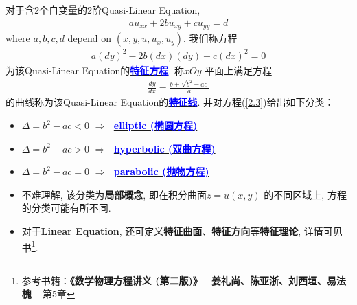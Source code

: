 	\begin{defn}\label{def 2.1.1}
		对于含2个自变量的2阶Quasi-Linear Equation, 
		\begin{align}
			au_{xx} + 2b u_{xy} + cu_{yy} = d \label{2.3}
		\end{align}
		where $a , b , c , d$ depend on $(x , y , u , u_x , u_y)$. 我们称方程
		\begin{align}
			a(dy)^2 - 2b(dx)(dy) + c(dx)^2 = 0 \label{2.4}
		\end{align}
		为该Quasi-Linear Equation的\underline{\textcolor{blue}{\textbf{特征方程}}}. 称$xOy$ 平面上满足方程
		\begin{align}
			\frac{dy}{dx} = \frac{b \pm \sqrt{b^2 - ac}}{a}
		\end{align}
		的曲线称为该Quasi-Linear Equation的\underline{\textcolor{blue}{\textbf{特征线}}}. 并对方程(\ref{2.3})给出如下分类： 
		
		\vspace*{1em}
		
		\begin{itemize}
			\item $\Delta = b^2 - ac < 0 \,\, \Rightarrow \,\,$ \underline{\textcolor{blue}{\textbf{elliptic (椭圆方程)}}}
			
			\item $\Delta = b^2 - ac > 0 \,\, \Rightarrow \,\,$ \underline{\textcolor{blue}{\textbf{hyperbolic (双曲方程)}}}
			
			\item $\Delta = b^2 - ac = 0 \,\, \Rightarrow \,\,$ \underline{\textcolor{blue}{\textbf{parabolic (抛物方程)}}}
		\end{itemize}
		
		\newpage
		
		\begin{rmk}
			\begin{itemize}
				\item 不难理解, 该分类为\textbf{局部概念}, 即在积分曲面$z = u(x , y)$ 的不同区域上, 方程的分类可能有所不同. 
				
				\vspace*{2em}
				
				\item 对于\textbf{Linear Equation}, 还可定义\textbf{特征曲面}、\textbf{特征方向}等\textbf{特征理论}, 详情可见书\footnote{参考书籍：\textbf{《数学物理方程讲义 (第二版)》--  姜礼尚、陈亚浙、刘西垣、易法槐} -- 第5章}. 
				
				\vspace*{2em}
				

\end{itemize}
\end{rmk}
\end{defn}
